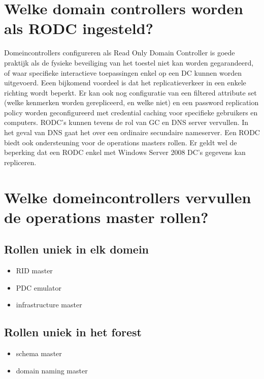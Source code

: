\section{Welke domain controllers worden als RODC ingesteld?}

Domeincontrollers configureren als Read Only Domain Controller is goede praktijk
als de fysieke beveiliging van het toestel niet kan worden gegarandeerd, of waar
specifieke interactieve toepassingen enkel op een DC kunnen worden uitgevoerd.
Eeen bijkomend voordeel is dat het replicatieverkeer in een enkele richting
wordt beperkt. Er kan ook nog configuratie van een filtered attribute set (welke
kenmerken worden gerepliceerd, en welke niet) en een password replication policy
worden geconfigureerd met credential caching voor specifieke gebruikers en
computers. RODC's kunnen tevens de rol van GC en DNS server vervullen. In het
geval van DNS gaat het over een ordinaire secundaire nameserver. Een RODC biedt
ook ondersteuning voor de operations masters rollen. Er geldt wel de beperking
dat een RODC enkel met Windows Server 2008 DC's gegevens kan repliceren.

\section{Welke domeincontrollers vervullen de operations master rollen?}

\subsection{Rollen uniek in elk domein}
\begin{itemize}
	\item RID master
	\item PDC emulator
	\item infrastructure master
\end{itemize}

\subsection{Rollen uniek in het forest}
\begin{itemize}
	\item schema master
	\item domain naming master
\end{itemize}
